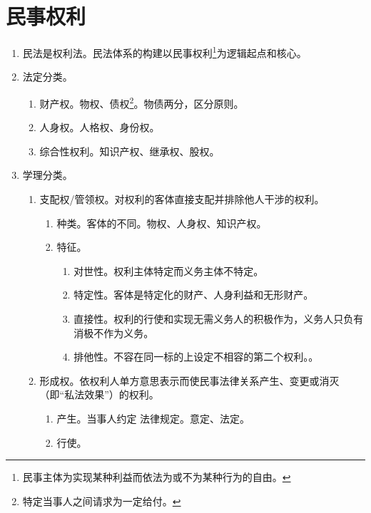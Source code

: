 \section{民事权利}
\begin{enumerate}
  \item 民法是权利法。民法体系的构建以民事权利\footnote{民事主体为实现某种利益而依法为或不为某种行为的自由。}为逻辑起点和核心。
  \item 法定分类。
        \begin{enumerate}
          \item 财产权。物权、债权\footnote{特定当事人之间请求为一定给付。}。物债两分，区分原则。
          \item 人身权。人格权、身份权。
          \item 综合性权利。知识产权、继承权、股权。
        \end{enumerate}
  \item 学理分类。
        \begin{enumerate}
          \item 支配权/管领权。对权利的客体直接支配并排除他人干涉的权利。
                \begin{enumerate}
                  \item 种类。客体的不同。物权、人身权、知识产权。
                  \item 特征。
                        \begin{enumerate}
                          \item 对世性。权利主体特定而义务主体不特定。
                          \item 特定性。客体是特定化的财产、人身利益和无形财产。
                          \item 直接性。权利的行使和实现无需义务人的积极作为，义务人只负有消极不作为义务。
                          \item 排他性。不容在同一标的上设定不相容的第二个权利。。
                        \end{enumerate}
                \end{enumerate}
          \item 形成权。依权利人单方意思表示而使民事法律关系产生、变更或消灭（即“私法效果”）的权利。
                \begin{enumerate}
                  \item 产生。当事人约定 \hz 法律规定。意定、法定。
                  \item 行使。
                        \begin{enumerate}

\end{enumerate}
\end{enumerate}
\end{enumerate}
\end{enumerate}
